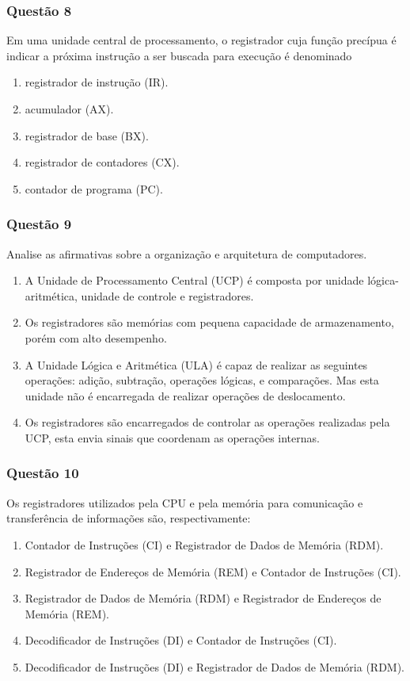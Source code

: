 \documentclass[	aspectratio=169,
				xcolor=table]{beamer}
\begin{document}
	\begin{frame}
		\frametitle{Questão 8}
		Em uma unidade central de processamento, o registrador cuja função precípua é indicar a próxima instrução a ser buscada para execução é denominado
		\begin{enumerate}[a]
			\item registrador de instrução (IR).
			\item acumulador (AX).
			\item registrador de base (BX).
			\item registrador de contadores (CX).
			\item contador de programa (PC).
		\end{enumerate}

	\end{frame}
	
	\begin{frame}
		\frametitle{Questão 9}
		Analise as afirmativas sobre a organização e arquitetura de computadores.
		\begin{enumerate}[i]
		\large
			\item A Unidade de Processamento Central (UCP) é composta por unidade lógica-aritmética, unidade de controle e registradores.
			\item Os registradores são memórias com pequena capacidade de armazenamento, porém com alto desempenho.
			\item A Unidade Lógica e Aritmética (ULA) é capaz de realizar as seguintes operações: adição, subtração, operações lógicas, e comparações. Mas esta unidade não é encarregada de realizar operações de deslocamento.
			\item Os registradores são encarregados de controlar as operações realizadas pela UCP, esta envia sinais que coordenam as operações internas.
			
		\end{enumerate}

	\end{frame}
	
	\begin{frame}
		\frametitle{Questão 10}
		Os registradores utilizados pela CPU e pela memória para comunicação e transferência de informações são, respectivamente:
		
		\begin{enumerate}[a]
			\item Contador de Instruções (CI) e Registrador de Dados de Memória (RDM).
			\item Registrador de Endereços de Memória (REM) e Contador de Instruções (CI).
			\item Registrador de Dados de Memória (RDM) e Registrador de Endereços de Memória (REM).
			\item  Decodificador de Instruções (DI) e Contador de Instruções (CI).
			\item  Decodificador de Instruções (DI) e Registrador de Dados de Memória (RDM).			
		\end{enumerate}
	\end{frame}
	
\end{document}
